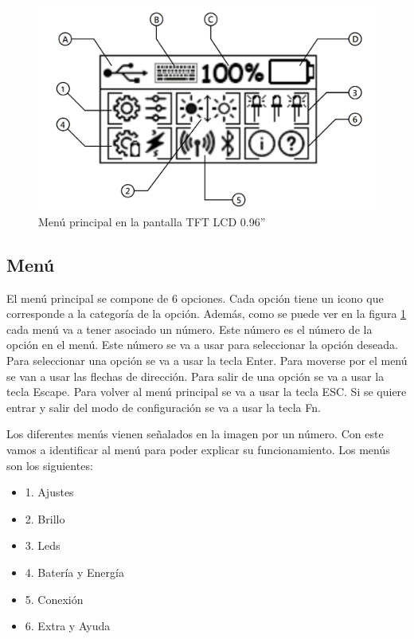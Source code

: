 \begin{figure}[H]
\centering
\includegraphics[width=1\textwidth]{imagenes/Capitulos/Cap07/PantallaMenuPrincipal.png}
\caption{Menú principal en la pantalla TFT LCD 0.96''}
\label{fig:MenuPrincipal}
\end{figure}

\subsection{Menú}

El menú principal se compone de 6 opciones. Cada opción tiene un icono que corresponde a la categoría de la opción. Además, como se puede ver en la figura \ref{fig:MenuPrincipal} cada menú va a tener asociado un número. Este número es el número de la opción en el menú. Este número se va a usar para seleccionar la opción deseada. Para seleccionar una opción se va a usar la tecla Enter. Para moverse por el menú se van a usar las flechas de dirección. Para salir de una opción se va a usar la tecla Escape. Para volver al menú principal se va a usar la tecla ESC. Si se quiere entrar y salir del modo de configuración se va a usar la tecla Fn.

Los diferentes menús vienen señalados en la imagen por un número. Con este vamos a identificar al menú para poder explicar su funcionamiento. Los menús son los siguientes:
\begin{itemize}
\item 1. Ajustes
\item 2. Brillo
\item 3. Leds
\item 4. Batería y Energía
\item 5. Conexión
\item 6. Extra y Ayuda
\end{itemize}

